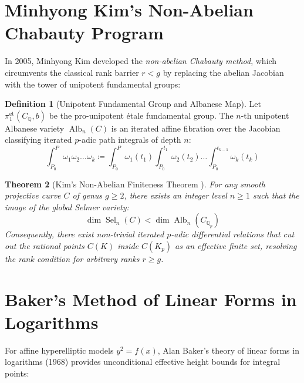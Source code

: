 \documentclass[11pt,a4paper]{article}
\newtheorem{theorem}{Theorem}[section]
\theoremstyle{definition}
\newtheorem{definition}[theorem]{Definition}
\begin{document}
\section{Minhyong Kim's Non-Abelian Chabauty Program}

In 2005, Minhyong Kim \cite{kim2005} developed the \emph{non-abelian Chabauty method}, which circumvents the classical rank barrier $r < g$ by replacing the abelian Jacobian with the tower of unipotent fundamental groups:

\begin{definition}[Unipotent Fundamental Group and Albanese Map]\label{def:albanese}
Let $\pi_1^{\text{et}}(C_{\overline{\mathbb{Q}}}, b)$ be the pro-unipotent étale fundamental group. The $n$-th unipotent Albanese variety $\operatorname{Alb}_n(C)$ is an iterated affine fibration over the Jacobian classifying iterated $p$-adic path integrals of depth $n$:
\begin{equation}\label{eq:iterated_int}
\int_{P_0}^P \omega_1 \omega_2 \dots \omega_k \coloneqq \int_{P_0}^P \omega_1(t_1) \int_{P_0}^{t_1} \omega_2(t_2) \dots \int_{P_0}^{t_{k-1}} \omega_k(t_k)
\end{equation}
\end{definition}

\begin{theorem}[Kim's Non-Abelian Finiteness Theorem \cite{kim2005, kim2009}]\label{thm:kim}
For any smooth projective curve $C$ of genus $g \ge 2$, there exists an integer level $n \ge 1$ such that the image of the global Selmer variety:
\begin{equation}\label{eq:selmer_dim}
\dim \operatorname{Sel}_n(C) < \dim \operatorname{Alb}_n(C_{\mathbb{Q}_p})
\end{equation}
Consequently, there exist non-trivial iterated $p$-adic differential relations that cut out the rational points $C(K)$ inside $C(K_p)$ as an effective finite set, resolving the rank condition for arbitrary ranks $r \ge g$.
\end{theorem}

\section{Baker's Method of Linear Forms in Logarithms}

For affine hyperelliptic models $y^2 = f(x)$, Alan Baker's theory of linear forms in logarithms (1968) \cite{baker1968} provides unconditional effective height bounds for integral points:
\end{document}
